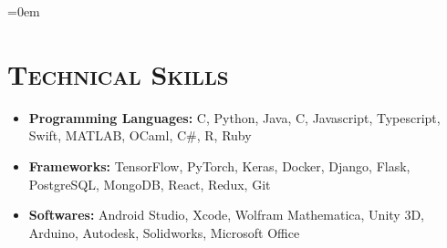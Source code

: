 \documentclass{article}
\makeatletter
\newenvironment{longversion}{}{} %
\newcommand{\headerrow}[2]
{\begin{tabular*}{\linewidth}{l@{\extracolsep{\fill}}r}
	#1 &
	#2 \\
\end{tabular*}}
\newcommand{\CPP}
{C\nolinebreak[4]\hspace{-.05em}\raisebox{.22ex}{\footnotesize\bf ++}}
\newcommand{\tmpsection}[1]{}
\let\tmpsection=\section
\renewcommand{\section}[1]{\tmpsection*{\textsc{#1}}}
\makeatother
\begin{document}
\begin{longversion}
\begin{list} {}{\leftmargin=0em}

\end{list}


\begin{longversion}
\section{Technical Skills}\begin{itemize}
\item \textbf{Programming Languages:}  \CPP, Python, Java, C, Javascript, Typescript, Swift, MATLAB, OCaml, C\#, R, Ruby
\item \textbf{Frameworks:} TensorFlow, PyTorch, Keras, Docker, Django, Flask, PostgreSQL, MongoDB, React, Redux, Git
\item \textbf{Softwares:} Android Studio, Xcode, Wolfram Mathematica, Unity 3D, Arduino, Autodesk, Solidworks, Microsoft Office

\end{itemize}

\end{longversion}

\end{longversion}
\end{document}

